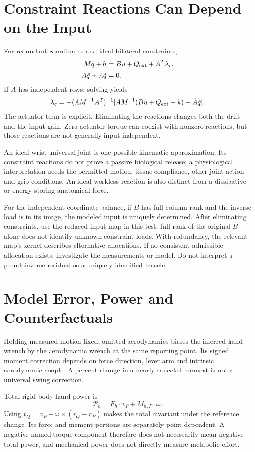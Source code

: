 \documentclass[11pt,a4paper]{article}
\begin{document}
\section{Constraint Reactions Can Depend on the Input}
For redundant coordinates and ideal bilateral constraints,
\begin{align}
M\ddot q+h&=Bu+Q_{\rm ext}+A^T\lambda_c,\\
A\ddot q+\dot A\dot q&=0.
\end{align}
If $A$ has independent rows, solving yields
\begin{equation}
\lambda_c=-(AM^{-1}A^T)^{-1}
[AM^{-1}(Bu+Q_{\rm ext}-h)+\dot A\dot q].
\end{equation}
The actuator term is explicit. Eliminating the reactions changes both the drift and the input gain. Zero actuator torque can coexist with nonzero reactions, but those reactions are not generally input-independent.

An ideal wrist universal joint is one possible kinematic approximation. Its constraint reactions do not prove a passive biological release; a physiological interpretation needs the permitted motion, tissue compliance, other joint action and grip conditions. An ideal workless reaction is also distinct from a dissipative or energy-storing anatomical force.

For the independent-coordinate balance, if $B$ has full column rank and the inverse load is in its image, the modeled input is uniquely determined. After eliminating constraints, use the reduced input map in this test; full rank of the original $B$ alone does not identify unknown constraint loads. With redundancy, the relevant map's kernel describes alternative allocations. If no consistent admissible allocation exists, investigate the measurements or model. Do not interpret a pseudoinverse residual as a uniquely identified muscle.

\section{Model Error, Power and Counterfactuals}
Holding measured motion fixed, omitted aerodynamics biases the inferred hand wrench by the aerodynamic wrench at the same reporting point. Its signed moment correction depends on force direction, lever arm and intrinsic aerodynamic couple. A percent change in a nearly canceled moment is not a universal swing correction.

Total rigid-body hand power is
\begin{equation}
\mathcal P_h=F_h\cdot v_P+M_{h,P}\cdot\omega.
\end{equation}
Using $v_Q=v_P+\omega\times(r_Q-r_P)$ makes the total invariant under the reference change. Its force and moment portions are separately point-dependent. A negative named torque component therefore does not necessarily mean negative total power, and mechanical power does not directly measure metabolic effort.
\end{document}
